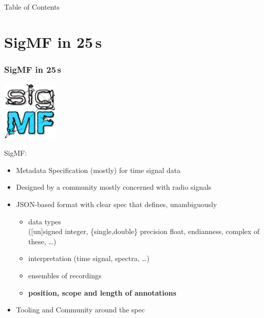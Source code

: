 \begin{frame}{Table of Contents}
  \tableofcontents
\end{frame}

\section{SigMF in 25\,s}
\begin{frame}{}\frametitle{SigMF in 25\,s}
  \hfill\includegraphics[width=0.2\textwidth,keepaspectratio]{sigmf_logo.png}

  \vspace{-0.15\textwidth}
  SigMF:
  \begin{itemize}
    \item Metadata Specification (mostly) for time signal data
    \item Designed by a community mostly concerned with radio signals
    \item JSON-based format with clear spec that defines, unambiguously
      \begin{itemize}
        \item  data types\\([un]signed integer, \{single,double\} precision float, endianness, complex of these, \ldots)
        \item  interpretation (time signal, spectra, …)
        \item  ensembles of recordings
        \item \textbf<2>{position, scope and length of annotations}
      \end{itemize}
    \item Tooling and Community around the spec
  \end{itemize}
\end{frame}

